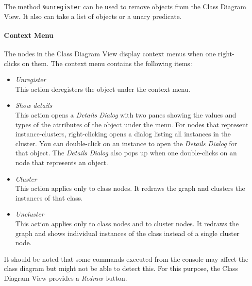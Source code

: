 The method {\tt \%unregister} can be used to remove objects from the Class
Diagram View.  It also can take a list of objects or a unary predicate.

\paragraph{Context Menu}
\label{sec:visualizerview_usage_contextmenu}

The nodes in the Class Diagram View display context menus when one
right-clicks on them. The context menu contains the following items:
\begin{itemize}
\item \emph{Unregister}\\
  This action deregisters the object under the context menu.

\item \emph{Show details} \\
  This action opens a \emph{Details Dialog} with two panes showing the
  values and types of the attributes of the object under the menu. For
  nodes that represent instance-clusters, right-clicking opens a dialog
  listing all instances in the cluster. You can double-click on an instance
  to open the \emph{Details Dialog} for that object.  The \emph{Details
    Dialog} also pops up when one double-clicks on an node that represents
  an object.

\item \emph{Cluster}\\
  This action applies only to \FLORA class nodes. It redraws the graph and
  clusters the instances of that class.

\item \emph{Uncluster}\\
  This action applies only to \FLORA class nodes and to cluster nodes. It
  redraws the graph and shows individual instances of the class instead of
  a single cluster node.
\end{itemize}

It should be noted that some commands executed from the console may affect
the class diagram but \FVIZ might not be able to detect this.
For this purpose, the Class Diagram View provides a \emph{Redraw} button.
